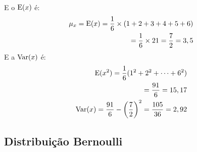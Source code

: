 \begin{description}
\begin{example}
\begin{align}
   \end{align}
   E o $\operatorname{E}(x)$ é: 
   \begin{align}
     \mu_{x}=\operatorname{E}(x)=\frac{1}{6} \times (1+2+3+4+5+6)\\
     =\frac{1}{6}\times 21= \frac{7}{2}=3,5
   \end{align}
   E a $\operatorname{Var}(x)$ é:
   \begin{align}
     \operatorname{E}(x^2)=\frac{1}{6}(1^2 + 2^2 + \dots + 6^2)\\
     =\frac{91}{6}=15,17\\
     \operatorname{Var}(x)=\frac{91}{6}- \left( \frac{7}{2} \right)^2=\frac{105}{36}=2,92
   \end{align}
\end{example}
\end{description}
 \subsection{Distribuição Bernoulli}
